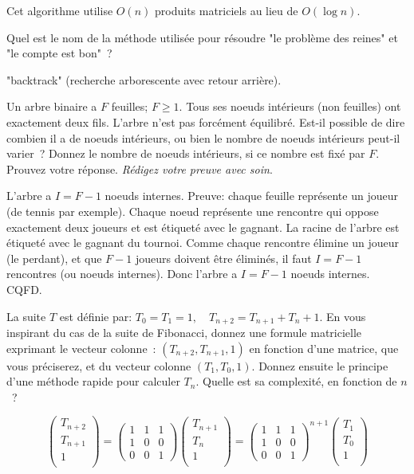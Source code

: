\documentclass[11pt]{article}
\begin{document}
{{\medskip

Cet algorithme utilise $O(n)$ produits matriciels au lieu de $O(\log n)$.

 {Quel est le nom de la méthode utilisée pour résoudre "le problème des reines" et "le compte est bon"~?}

\medskip

"backtrack" (recherche arborescente avec retour arrière).

 Un arbre binaire a $F$ feuilles; $F\ge 1$. 
Tous ses noeuds intérieurs (non feuilles) ont exactement deux fils.
L'arbre n'est pas forcément équilibré. Est-il possible de dire combien 
il a de noeuds intérieurs, ou bien le nombre de noeuds intérieurs peut-il varier~?
Donnez le nombre de  noeuds intérieurs, si ce nombre est fixé par $F$. Prouvez votre réponse.
{\it Rédigez votre preuve  avec soin}.

\medskip


L'arbre a $I=F-1$ noeuds internes. Preuve: chaque feuille représente un joueur (de tennis par exemple). Chaque noeud représente une rencontre qui oppose exactement  deux joueurs et est étiqueté avec le gagnant. La racine de l'arbre est étiqueté avec le gagnant du tournoi. Comme chaque rencontre élimine un joueur (le perdant),
et que $F-1$ joueurs doivent être éliminés,
il faut $I=F-1$ rencontres (ou noeuds internes). Donc l'arbre a $I=F-1$ noeuds internes.
CQFD.

 La suite $T$ est définie par: $T_0=T_1=1, \quad T_{n+2}= T_{n+1}+ T_{n} + 1 $.
En vous inspirant du cas de la suite de Fibonacci, donnez une formule matricielle
exprimant le vecteur  colonne~:  
$(T_{n+2}, T_{n+1}, 1)$ en fonction d'une matrice, que vous préciserez, et du vecteur
colonne $(T_1, T_0, 1)$. Donnez ensuite le principe d'une méthode
rapide pour calculer $T_n$. Quelle est sa complexité, en fonction de $n$~?

\medskip

$$\left(\begin{array}{c}
T_{n+2} \\
 T_{n+1}\\
1 \\
\end{array}\right)= \left(\begin{array}{ccc}
1 & 1 & 1 \\
1 & 0 & 0 \\
0 & 0 & 1 
\end{array}\right)\left(\begin{array}{c}
T_{n+1}\\
T_n \\
1\\
\end{array}\right)= \left(\begin{array}{ccc}
1 & 1 & 1 \\
1 & 0 & 0 \\
0 & 0 & 1 
\end{array}\right)^{n+1}\left(\begin{array}{c}
T_{1}\\
T_0 \\
1\\
\end{array}\right)$$

}}
\end{document}
